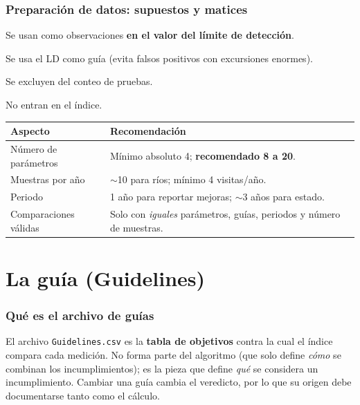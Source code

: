 \documentclass[11pt,a4paper]{article}
\begin{document}
\section{Preparación de datos: supuestos y matices}
\begin{description}[leftmargin=1.3em,style=nextline]
  \item[No detectados (``$<x$'' o ``L$x$'').] Se usan como observaciones \textbf{en el valor del límite de detección}.
  \item[Límite de detección $>$ guía.] Se usa el LD como guía (evita falsos positivos con excursiones enormes).
  \item[Datos faltantes.] Se excluyen del conteo de pruebas.
  \item[Parámetros sin guía.] No entran en el índice.
\end{description}
\begin{center}\renewcommand{\arraystretch}{1.15}
\begin{tabular}{@{}p{5cm} p{9.6cm}@{}}
\toprule \textbf{Aspecto} & \textbf{Recomendación} \\ \midrule
Número de parámetros & Mínimo absoluto 4; \textbf{recomendado 8 a 20}. \\
Muestras por año & $\sim$10 para ríos; mínimo 4 visitas/año. \\
Periodo & 1 año para reportar mejoras; $\sim$3 años para estado. \\
Comparaciones válidas & Solo con \emph{iguales} parámetros, guías, periodos y número de muestras. \\ \bottomrule
\end{tabular}
\end{center}

\part{La guía (Guidelines)}

\section{Qué es el archivo de guías}
El archivo \texttt{Guidelines.csv} es la \textbf{tabla de objetivos} contra la cual el índice compara
cada medición. No forma parte del algoritmo (que solo define \emph{cómo} se combinan los
incumplimientos); es la pieza que define \emph{qué} se considera un incumplimiento. Cambiar una guía
cambia el veredicto, por lo que su origen debe documentarse tanto como el cálculo.
\end{document}
